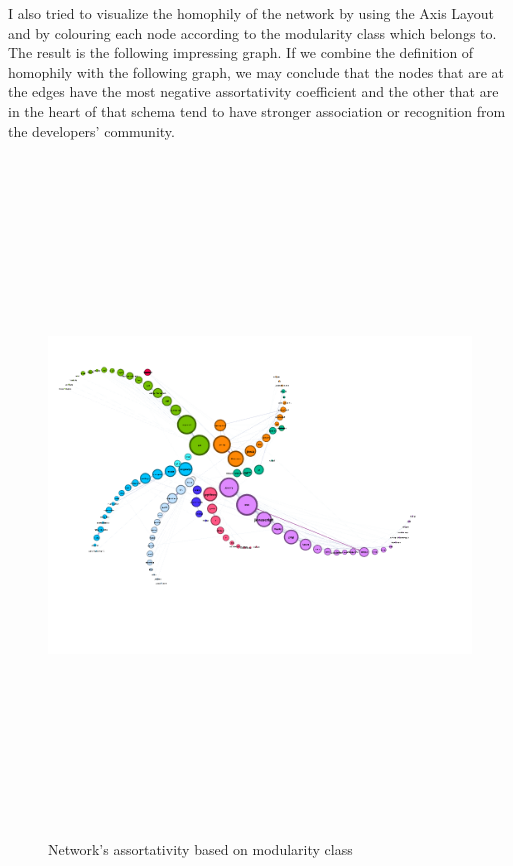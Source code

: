 \documentclass[12pt]{article}
\begin{document}
			\FloatBarrier
			I also tried to visualize the homophily of the network by using the Axis Layout and by colouring each node according to the modularity class which belongs to. The result is the following impressing graph. If we combine the definition of homophily with the following graph, we may conclude that the nodes that are at the edges have the most negative assortativity coefficient and the other that are in the heart of that schema tend to have stronger association or recognition from the developers' community.
			\begin{figure}[ht]
				\includegraphics[width=21cm,height=18cm]{homophilymodclass}
				\caption{Network's assortativity based on modularity class}
			\end{figure}
			\FloatBarrier
			
\end{document}
